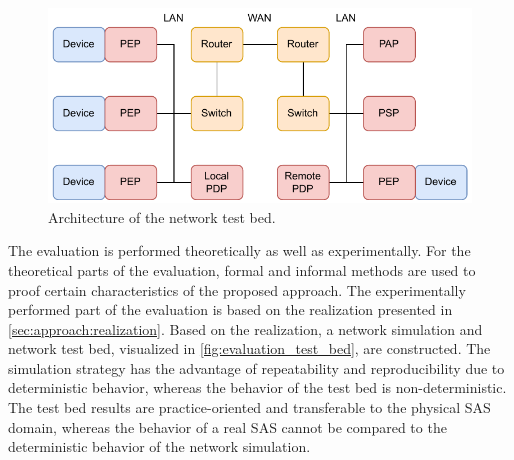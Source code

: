 \begin{figure}
    \centering
    \includegraphics[width=0.7\linewidth]{figures/network_testbed_color.drawio.pdf}
    \caption{Architecture of the network test bed.}
    \label{fig:evaluation_test_bed}
\end{figure}
The evaluation is performed theoretically as well as experimentally.
For the theoretical parts of the evaluation, formal and informal methods are used to proof certain characteristics of the proposed approach.
The experimentally performed part of the evaluation is based on the realization presented in \autoref{sec:approach:realization}.
Based on the realization, a network simulation and network test bed, visualized in \autoref{fig:evaluation_test_bed}, are constructed.
The simulation strategy has the advantage of repeatability and reproducibility due to deterministic behavior, whereas the behavior of the test bed is non-deterministic.
The test bed results are practice-oriented and transferable to the physical SAS domain, whereas the behavior of a real SAS cannot be compared to the deterministic behavior of the network simulation.

